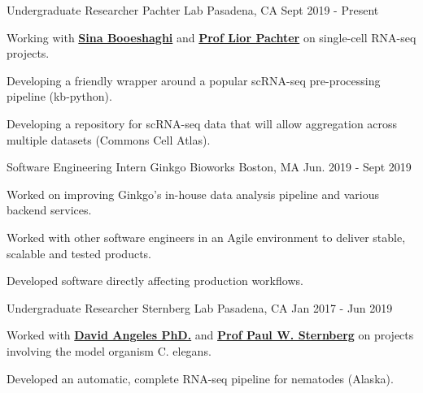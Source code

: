 

\begin{cventries}

\cventry
  {Undergraduate Researcher} %
  {Pachter Lab} %
  {Pasadena, CA} %
  {Sept 2019 - Present} %
  {
    \begin{cvitems} %
      \item {Working with \textbf{\href{https://sinabooeshaghi.com/}{Sina Booeshaghi}} and \textbf{\href{https://pachterlab.github.io/biography.html}{Prof Lior Pachter}} on single-cell RNA-seq projects.}
      \item {Developing a friendly wrapper around a popular scRNA-seq pre-processing pipeline (kb-python).}
      \item {Developing a repository for scRNA-seq data that will allow aggregation across multiple datasets (Commons Cell Atlas).}
    \end{cvitems}
  }

  \cventry
    {Software Engineering Intern} %
    {Ginkgo Bioworks} %
    {Boston, MA} %
    {Jun. 2019 - Sept 2019} %
    {
      \begin{cvitems} %
        \item {Worked on improving Ginkgo's in-house data analysis pipeline and various backend services.}
        \item {Worked with other software engineers in an Agile environment to deliver stable, scalable and tested products.}
        \item {Developed software directly affecting production workflows.}
      \end{cvitems}
    }

\cventry
  {Undergraduate Researcher} %
  {Sternberg Lab} %
  {Pasadena, CA} %
  {Jan 2017 - Jun 2019} %
  {
    \begin{cvitems} %
      \item {Worked with \textbf{\href{https://dangeles.github.io/}{David Angeles PhD.}} and \textbf{\href{http://wormlab.caltech.edu/LabMembers/Paul}{Prof Paul W. Sternberg}} on projects involving the model organism C. elegans.}
      \item {Developed an automatic, complete RNA-seq pipeline for nematodes (Alaska).}
    \end{cvitems}
  }

\end{cventries}
